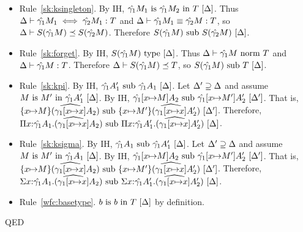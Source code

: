 \documentclass{article}
\theoremstyle{break}
\newcommand{\qed}{\mbox{QED}}
\newcommand{\env}{\gamma}
\newcommand{\envone}{\hat{\env_1}}
\newcommand{\envtwo}{\hat{\env_2}}
\newcommand{\envonex}{\widehat{\env_1[\cvar{\mapsto}\cvar]}}
\newenvironment{proof}{\noindent{\bf Proof:}\hspace*{0.5em}}{\hspace*{\fill}\qed}
\begin{document}
\begin{proof}
\begin{itemize}
\item Rule~\ref{sk:ksingleton}.
By IH, $\semanticequivterm{\world}{\envone\constructor_1}{\envone\constructor_2}{\ktype}$.  Thus
$\aconequiv{\world}{\envone\constructor_1}{\envtwo\constructor_1}{\ktype}$ and
$\equivconstructor{\world}{\envone\constructor_1}{\envtwo\constructor}{\ktype}$, so
$\subkind{\world}{\ksingleton{\envone\constructor}}{\ksingleton{\envtwo\constructor}}$.
Therefore $\semanticsubtype{\world}{\ksingleton{\envone\constructor}}{\ksingleton{\envtwo\constructor}}$.

\item Rule~\ref{sk:forget}.
By IH, 
$\semanticvalidtype{\world}{\ksingleton{\envone\constructor}}$.
Thus
$\normterm{\world}{\envone\constructor}{\ktype}$ and
$\validconstructor{\world}{\envone\constructor}{\ktype}$.
Therefore
$\subkind{\world}{\ksingleton{\envone\constructor}}{\ktype}$, so
$\semanticsubtype{\world}{\ksingleton{\envone\constructor}}{\ktype}$.

\item Rule~\ref{sk:kpi}.
By IH,
$\semanticsubtype{\world}{\envone\kind'_1}{\envone\kind_1}$.
Let $\Delta'\supseteq\Delta$ and assume
$\semanticequivterm{\world}{\constructor}{\constructor'}{\envone\kind'_1}$.
By IH,
$\semanticsubtype{\world'}{\envone[\cvar{\mapsto}\constructor]\kind_2}
    {\envone[\cvar{\mapsto}\constructor']\kind'_2}$. %
That is,
$\semanticsubtype{\world'}{\substitute{\cvar}{\constructor}{(\envonex\kind_2)}}
    {\substitute{\cvar}{\constructor'}{(\envonex\kind'_2)}}$.
Therefore, 
$\semanticsubtype{\world}{\kpi{\cvar}{\envone\kind_1}{(\envonex\kind_2})}
   {\kpi{\cvar}{\envone\kind'_1}{(\envonex\kind'_2)}}$. %

\item Rule~\ref{sk:ksigma}.
By IH,
$\semanticsubtype{\world}{\envone\kind_1}{\envone\kind'_1}$.
Let $\Delta'\supseteq\Delta$ and assume
$\semanticequivterm{\world}{\constructor}{\constructor'}{\envone\kind_1}$.
By IH,
$\semanticsubtype{\world'}{\envone[\cvar{\mapsto}\constructor]\kind_2}
    {\envone[\cvar{\mapsto}\constructor']\kind'_2}$. %
That is,
$\semanticsubtype{\world'}{\substitute{\cvar}{\constructor}{(\envonex\kind_2)}}
    {\substitute{\cvar}{\constructor'}{(\envonex\kind'_2)}}$. %
Therefore, 
$\semanticsubtype{\world}{\ksigma{\cvar}{\envone\kind_1}{(\envonex\kind_2})}
   {\ksigma{\cvar}{\envone\kind'_1}{(\envonex\kind'_2)}}$. %

\item Rule~\ref{wfc:basetype}.
${b}\mathrm{\ is\ }{b}\mathrm{\ in\ }{T}\ [\Delta]$ by definition.


\end{itemize}
\end{proof}
\end{document}
